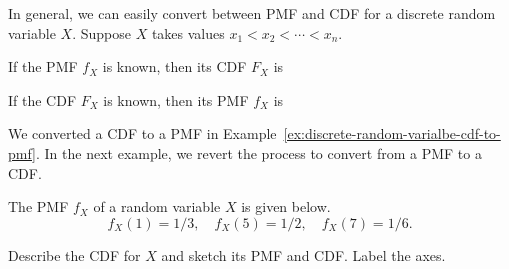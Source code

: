 \documentclass[../main.tex]{subfiles}
\begin{document}
In general, we can easily convert between PMF and CDF for a discrete random variable \(X\). Suppose \(X\) takes values \(x_{1} < x_{2} < \cdots < x_{n}\).

\faStar{} If the PMF \(f_{X}\) is known, then its CDF \(F_{X}\) is

\faStar{} If the CDF \(F_{X}\) is known, then its PMF \(f_{X}\) is

We converted a CDF to a PMF in Example~\ref{ex:discrete-random-varialbe-cdf-to-pmf}. In the next example, we revert the process to convert from a PMF to a CDF.
\begin{example} \label{ex:discrete-random-varialbe-pmf-to-cdf}
  The PMF \(f_{X}\) of a random variable \(X\) is given below.
  \[
    f_{X}(1) = 1/3, \quad f_{X}(5) = 1/2, \quad f_{X}(7) = 1/6.
  \]

  Describe the CDF for \(X\) and sketch its PMF and CDF. Label the axes.


\end{example}
\end{document}
